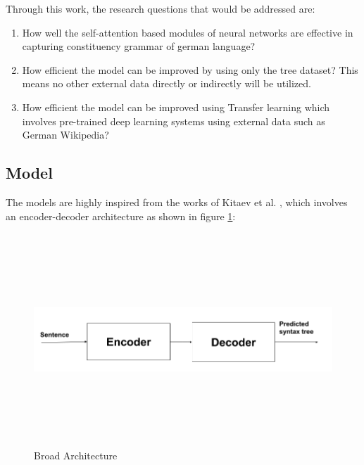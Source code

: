 \documentclass[a4paper, 11pt]{article}
\begin{document}
Through this work, the research questions that would be addressed are:
\begin{enumerate}
\item How well the self-attention based modules of neural networks are effective in capturing constituency grammar of german language? 
\item How efficient the model can be improved by using only the tree dataset? This means no other external data directly or indirectly will be utilized. 
\item How efficient the model can be improved using Transfer learning which involves pre-trained deep learning systems using external data such as German Wikipedia?
\end{enumerate}

\subsection{Model}

The models are highly inspired from the works of Kitaev et al. \parencite*{Kitaev2019}, which involves an encoder-decoder architecture as shown in figure \ref{fig:broad_architecture}:

\begin{figure}[htpb]
    \centering
    \includegraphics[width=\textwidth,height=8cm,keepaspectratio=true]
    {encoder-decoder.png}
    \caption{
        Broad Architecture
    }
    \label{fig:broad_architecture}
\end{figure}
\end{document}
